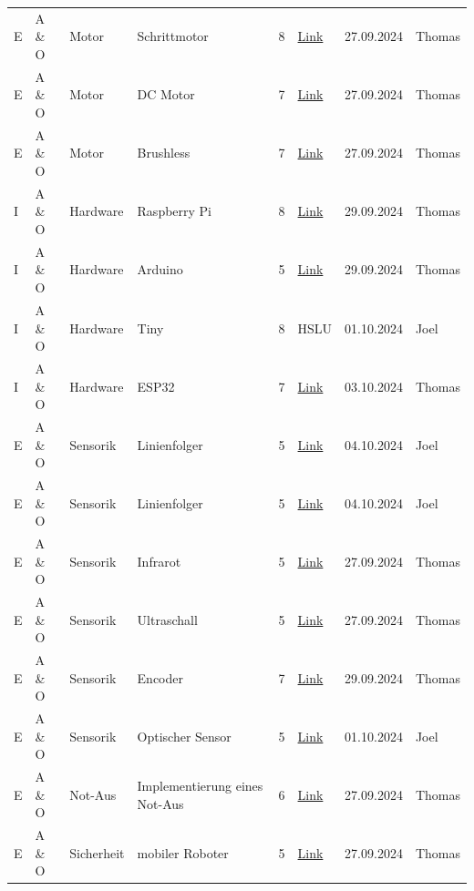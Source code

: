 \documentclass[../main.tex]{subfiles}
\begin{document}
\begin{longtable}{lp{2cm}p{2cm}p{4cm}clcl}
E & A \& O & Motor & Schrittmotor & 8 & \href{https://wiki.bu.ost.ch/infoportal/_media/hardware/sysp/bauteile/schrittmotor_kurz_erklaert_d.pdf}{Link} & 27.09.2024 & Thomas
\tabularnewline
E & A \& O & Motor & DC Motor & 7 & \href{https://www.arrow.de/research-and-events/articles/which-dc-motor-is-best-for-your-application}{Link} & 27.09.2024 & Thomas
\tabularnewline
E & A \& O & Motor & Brushless & 7 & \href{https://www.renesas.com/en/support/engineer-school/brushless-dc-motor-01-overview}{Link} & 27.09.2024 & Thomas
\tabularnewline
I & A \& O & Hardware & Raspberry Pi & 8 & \href{https://www.raspberrypi.com/documentation/computers/raspberry-pi.html}{Link} & 29.09.2024 & Thomas
\tabularnewline
I & A \& O & Hardware & Arduino & 5 & \href{https://arduino.cc/en/hardware#boards-1}{Link} & 29.09.2024 & Thomas
\tabularnewline
I & A \& O & Hardware & Tiny & 8 & HSLU & 01.10.2024 & Joel
\tabularnewline
I & A \& O & Hardware & ESP32 & 7 & \href{https://www.espressif.com/en/products/devkits/esp32-devkitc}{Link} & 03.10.2024 & Thomas
\tabularnewline
E & A \& O & Sensorik & Linienfolger & 5 & \href{https://pglu.ch/3-mit-fahrroboter-linie-folgen/?srsltid=AfmBOor3qIbdXGD1WYtV-YadIVjE2Urm7U3QGtes_IjcCzCVViC2yody}{Link} & 04.10.2024 & Joel
\tabularnewline
E & A \& O & Sensorik & Linienfolger & 5 & \href{https://spacehal.github.io/docs/robotik/edgeFollower}{Link} & 04.10.2024 & Joel
\tabularnewline
E & A \& O & Sensorik & Infrarot & 5 & \href{https://www.elektronik-kompendium.de/sites/raspberry-pi/2802011.htm}{Link} & 27.09.2024 & Thomas
\tabularnewline
E & A \& O & Sensorik & Ultraschall & 5 & \href{https://elektro.turanis.de/html/prj121/index.html}{Link} & 27.09.2024 & Thomas 
\tabularnewline
E & A \& O & Sensorik & Encoder & 7 & \href{https://www.arrow.de/research-and-events/articles/rotary-encoders-how-to-pair-with-an-arduino-board}{Link} & 29.09.2024 & Thomas
\tabularnewline
E & A \& O & Sensorik & Optischer Sensor & 5 & \href{https://global.sharp/products/device/lineup/data/pdf/datasheet/gp2y0e02a_e.pdf}{Link} & 01.10.2024 & Joel
\tabularnewline
E & A \& O & Not-Aus & Implementierung eines Not-Aus & 6 &
\href{https://www.eaton.com/ie/en-gb/markets/machine-building/service-and-support-machine-building-moem-service-eaton/blogs/emergency-stop-circuit---blogs---eaton.html}{Link} & 27.09.2024 & Thomas
\tabularnewline
E & A \& O & Sicherheit & mobiler Roboter & 5 & \href{https://tuprints.ulb.tu-darmstadt.de/18674/1/10.1524_auto.51.10.435.19576.pdf}{Link} & 27.09.2024 & Thomas 

\end{longtable}
\end{document}
